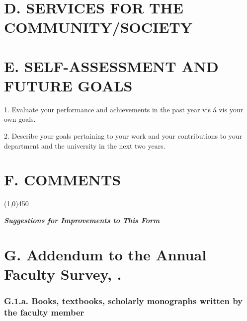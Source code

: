 \documentclass[12pt]{article}
\begin{document}


\section*{D. SERVICES FOR THE COMMUNITY/SOCIETY}


\section*{E. SELF-ASSESSMENT AND FUTURE GOALS}

1. Evaluate your performance and achievements in the past year vis á vis your own goals. 

2. Describe your goals pertaining to your work and your contributions to your department and the university in the next two years. 


\section*{F. COMMENTS}




\begin{center}
\line(1,0){450}
\end{center}
{\large\textbf {\textit {Suggestions for Improvements to This Form}}}



\clearpage

\section*{G. Addendum to the Annual Faculty Survey, \the\year.}

\subsubsection*{G.1.a. Books, textbooks, scholarly monographs written by the faculty member}
\end{document}
